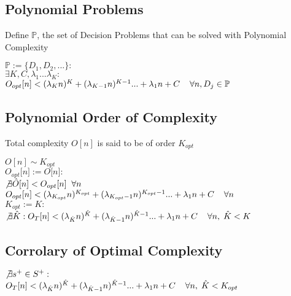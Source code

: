 \documentclass[11pt]{article}
\begin{document}
\subsection{Polynomial Problems}
Define $\mathbb{P}$, the set of Decision Problems that can be solved with Polynomial Complexity
\begin{center}
$
\mathbb{P} := \{D_1,D_2,...\} : 
$
\\
$
\exists K,C,\lambda_1...\lambda_K : 
$
\\
$
O_{opt}[n] < (\lambda_K n)^K + (\lambda_{K-1} n)^{K-1}... + \lambda_1 n + C \hspace{4mm} \forall n, D_j \in \mathbb{P}
$
\end{center}





\subsection{Polynomial Order of Complexity}
Total complexity $O[n]$ is said to be of order $K_{opt}$
\begin{center}
$
 O[n] \sim K_{opt}
$
\\ \vspace{2mm}
$O_{opt}\lbrack n \rbrack := O \lbrack n \rbrack :$
\\ \vspace{2mm}
$ \not \exists \hat{O} \lbrack n \rbrack < O_{opt}\lbrack n \rbrack \hspace{2mm} \forall n$
\\ \vspace{2mm}
$O_{opt}[n] < (\lambda_{K_{opt}} n)^{K_{opt}} + (\lambda_{K_{opt}-1} n)^{K_{opt}-1}... + \lambda_1 n +  C \hspace{4mm} \forall n$
\\ \vspace{2mm}
$K_{opt} := K :$
\\ \vspace{2mm}
$\not \exists \hat{K} : O_{T}[n] < (\lambda_{\hat{K}} n)^{\hat{K}} + (\lambda_{\hat{K}-1} n)^{\hat{K}-1}... + \lambda_1 n +  C \hspace{4mm} \forall n,\hspace{1mm} \hat{K} < K$
\end{center}








\subsection{Corrolary of Optimal Complexity}
\begin{center}
$\not \exists s^+ \in S^+ :$
\\ \vspace{2mm}
$O_{T}[n] < (\lambda_{\hat{K}} n)^{\hat{K}} + (\lambda_{\hat{K}-1} n)^{\hat{K}-1}... + \lambda_1 n +  C \hspace{4mm} \forall n,\hspace{1mm} \hat{K} < K_{opt}$
\end{center}
\end{document}
